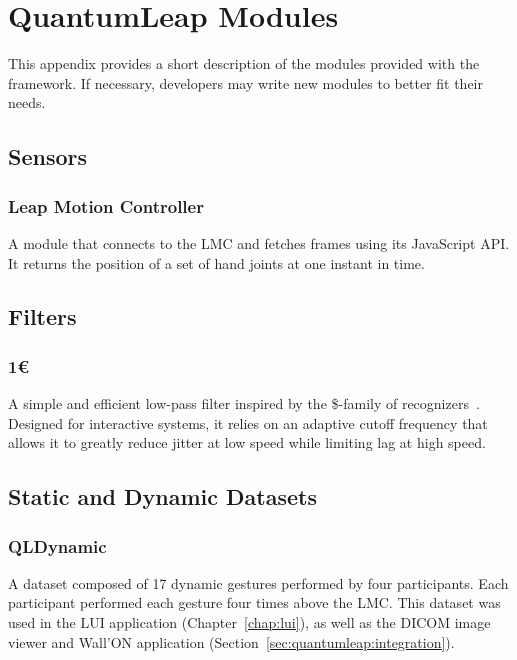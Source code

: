 \chapter{QuantumLeap Modules} \label{app:quantumleap-modules}
This appendix provides a short description of the modules provided with the \ql framework. If necessary, developers may write new modules to better fit their needs.

\section{Sensors} \label{app:quantumleap-modules:sensors}
\subsection{Leap Motion Controller}
A module that connects to the LMC and fetches frames using its JavaScript API. It returns the position of a set of hand joints at one instant in time.

\section{Filters} \label{app:quantumleap-modules:filters}
\subsection{1\euro}
A simple and efficient low-pass filter inspired by the \$-family of recognizers~\cite{Casiez:2012}. Designed for interactive systems, it relies on an adaptive cutoff frequency that allows it to greatly reduce jitter at low speed while limiting lag at high speed.

\section{Static and Dynamic Datasets} \label{app:quantumleap-modules:datasets}
\subsection{QLDynamic} 
A dataset composed of 17 dynamic gestures performed by four participants. Each participant performed each gesture four times above the LMC. This dataset was used in the LUI application (Chapter~\ref{chap:lui}), as well as the DICOM image viewer and Wall'ON application (Section~\ref{sec:quantumleap:integration}).
